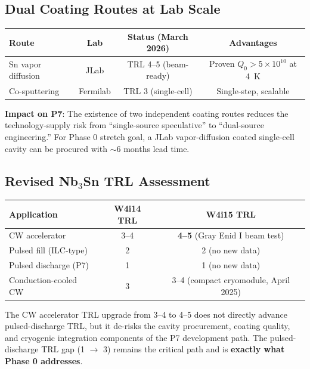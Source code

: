 \documentclass[11pt]{article}
\newcommand{\ee}[1]{\times 10^{#1}}
\begin{document}
\subsection{Dual Coating Routes at Lab Scale}

\begin{center}
\begin{tabular}{lccc}
\toprule
Route & Lab & Status (March 2026) & Advantages \\
\midrule
Sn vapor diffusion & JLab & TRL 4--5 (beam-ready) &
  Proven $Q_0 > 5\ee{10}$ at 4~K \\
Co-sputtering & Fermilab & TRL 3 (single-cell) &
  Single-step, scalable \\
\bottomrule
\end{tabular}
\end{center}

\textbf{Impact on P7}: The existence of two independent coating
routes reduces the technology-supply risk from ``single-source
speculative'' to ``dual-source engineering.'' For Phase 0 stretch
goal, a JLab vapor-diffusion coated single-cell cavity can be
procured with $\sim$6 months lead time.

\subsection{Revised Nb$_3$Sn TRL Assessment}

\begin{center}
\begin{tabular}{lcc}
\toprule
Application & W4i14 TRL & W4i15 TRL \\
\midrule
CW accelerator & 3--4 & \textbf{4--5} (Gray Enid I beam test) \\
Pulsed fill (ILC-type) & 2 & 2 (no new data) \\
Pulsed discharge (P7) & 1 & 1 (no new data) \\
Conduction-cooled CW & 3 & 3--4 (compact cryomodule, April 2025) \\
\bottomrule
\end{tabular}
\end{center}

The CW accelerator TRL upgrade from 3--4 to 4--5 does not directly
advance pulsed-discharge TRL, but it de-risks the cavity procurement,
coating quality, and cryogenic integration components of the P7
development path. The pulsed-discharge TRL gap (1 $\to$ 3) remains
the critical path and is \textbf{exactly what Phase 0 addresses}.

\end{document}
